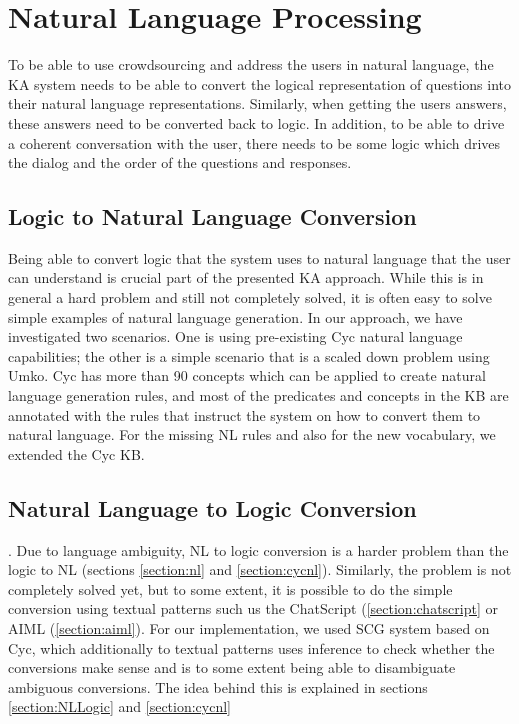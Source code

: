 \section{Natural Language Processing}
\label{section:bg:nlp}
To be able to use crowdsourcing and address the users in natural language, the 
KA system needs to be able to convert the logical representation of questions 
into their natural language representations. Similarly, when getting the users 
answers, these answers need to be converted back to logic. In addition, to be 
able to drive a coherent conversation with the user, there needs to be some 
logic which drives the dialog and the order of the questions and responses.

\subsection{Logic to Natural Language Conversion}
Being able to convert logic that the system uses to natural language that the 
user can understand is crucial part of the presented KA approach. While this is 
in general a hard problem and still not completely solved, it is often easy to 
solve simple examples of natural language generation. In our approach, we have 
investigated two scenarios. One is using pre-existing Cyc natural language 
capabilities; the other is a simple scenario that is a scaled down problem 
using Umko. Cyc has more than 90 concepts which can be applied to create 
natural language generation rules\parencite{Baxter2005}, and most of the 
predicates and concepts in the KB are annotated with the rules that instruct 
the system on how to convert them to natural language. For the missing NL 
rules and also for the new vocabulary, we extended the Cyc KB.

\subsection{Natural Language to Logic Conversion}. Due to language ambiguity, 
NL to logic conversion is a harder problem than the logic to NL
\parencite{Schneider2015} (sections \ref{section:nl} and \ref{section:cycnl}). 
Similarly, the problem is not completely solved yet, but to some extent, it is 
possible to do the simple conversion using textual patterns such us the 
ChatScript (\autoref{section:chatscript} or AIML (\autoref{section:aiml}). 
For our implementation, we used SCG system based on Cyc, which additionally to 
textual patterns uses 
inference to check whether the conversions make sense and is to some extent 
being able to disambiguate ambiguous conversions\parencite{Schneider2015}.
The idea behind this is explained in sections \ref{section:NLLogic} and
\ref{section:cycnl}

